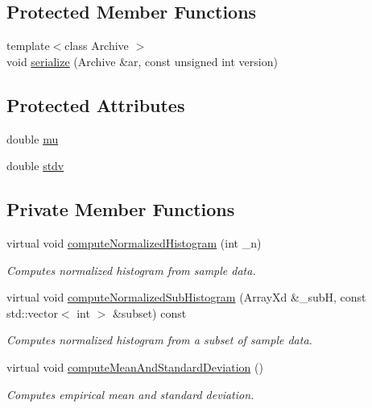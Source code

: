 \subsection*{Protected Member Functions}
\begin{DoxyCompactItemize}
\item 
{\footnotesize template$<$class Archive $>$ }\\void \hyperlink{class_c_continuous_sample_ab5508a93778215d7408fde456f9e8faf}{serialize} (Archive \&ar, const unsigned int version)
\end{DoxyCompactItemize}
\subsection*{Protected Attributes}
\begin{DoxyCompactItemize}
\item 
double \hyperlink{class_c_continuous_sample_a1e4e0d9a75c4111d5c5c3bc67ded57bb}{mu}
\item 
double \hyperlink{class_c_continuous_sample_a5ccdb718bac3e945f5e593d0137717e0}{stdv}
\end{DoxyCompactItemize}
\subsection*{Private Member Functions}
\begin{DoxyCompactItemize}
\item 
virtual void \hyperlink{class_c_continuous_sample_a59be50a77a49716c8fd181c2c1eb10bd}{compute\-Normalized\-Histogram} (int \-\_\-n)
\begin{DoxyCompactList}\small\item\em Computes normalized histogram from sample data. \end{DoxyCompactList}\item 
virtual void \hyperlink{class_c_continuous_sample_a2d7208d5acb81d8d9e69e7c24a916d99}{compute\-Normalized\-Sub\-Histogram} (Array\-Xd \&\-\_\-sub\-H, const std\-::vector$<$ int $>$ \&subset) const 
\begin{DoxyCompactList}\small\item\em Computes normalized histogram from a subset of sample data. \end{DoxyCompactList}\item 
virtual void \hyperlink{class_c_continuous_sample_a50aa31aff2e9767744e74f9b482aa8c5}{compute\-Mean\-And\-Standard\-Deviation} ()
\begin{DoxyCompactList}\small\item\em Computes empirical mean and standard deviation. \end{DoxyCompactList}\end{DoxyCompactItemize}

